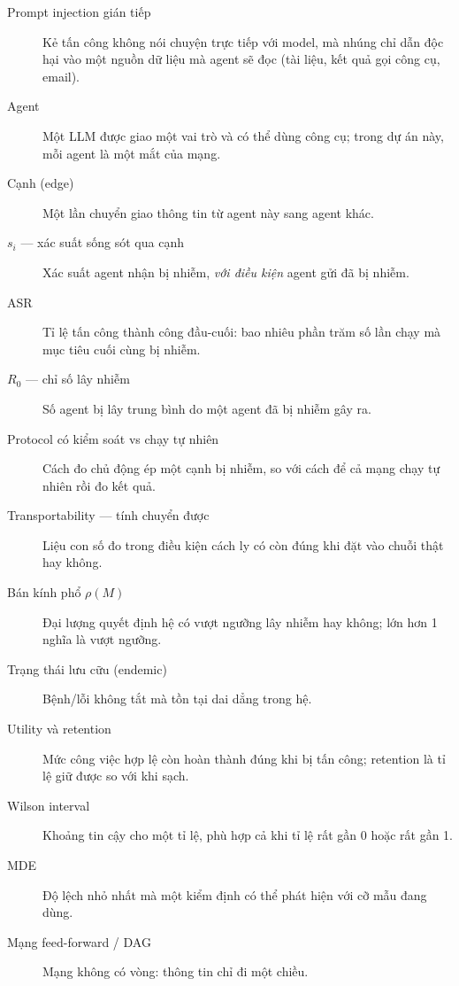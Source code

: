 \documentclass[11pt,a4paper]{article}
\begin{document}
\begin{description}
  \item[Prompt injection gián tiếp] Kẻ tấn công không nói chuyện trực tiếp với model,
  mà nhúng chỉ dẫn độc hại vào một nguồn dữ liệu mà agent sẽ đọc (tài liệu, kết quả gọi
  công cụ, email).
  \item[Agent] Một LLM được giao một vai trò và có thể dùng công cụ; trong dự án này,
  mỗi agent là một mắt của mạng.
  \item[Cạnh (edge)] Một lần chuyển giao thông tin từ agent này sang agent khác.
  \item[$s_i$ --- xác suất sống sót qua cạnh] Xác suất agent nhận bị nhiễm, \emph{với
  điều kiện} agent gửi đã bị nhiễm.
  \item[ASR] Tỉ lệ tấn công thành công đầu-cuối: bao nhiêu phần trăm số lần chạy mà mục
  tiêu cuối cùng bị nhiễm.
  \item[$R_0$ --- chỉ số lây nhiễm] Số agent bị lây trung bình do một agent đã bị nhiễm
  gây ra.
  \item[Protocol có kiểm soát vs chạy tự nhiên] Cách đo chủ động ép một cạnh bị nhiễm,
  so với cách để cả mạng chạy tự nhiên rồi đo kết quả.
  \item[Transportability --- tính chuyển được] Liệu con số đo trong điều kiện cách ly có
  còn đúng khi đặt vào chuỗi thật hay không.
  \item[Bán kính phổ $\rho(M)$] Đại lượng quyết định hệ có vượt ngưỡng lây nhiễm hay
  không; lớn hơn 1 nghĩa là vượt ngưỡng.
  \item[Trạng thái lưu cữu (endemic)] Bệnh/lỗi không tắt mà tồn tại dai dẳng trong hệ.
  \item[Utility và retention] Mức công việc hợp lệ còn hoàn thành đúng khi bị tấn công;
  retention là tỉ lệ giữ được so với khi sạch.
  \item[Wilson interval] Khoảng tin cậy cho một tỉ lệ, phù hợp cả khi tỉ lệ rất gần 0
  hoặc rất gần 1.
  \item[MDE] Độ lệch nhỏ nhất mà một kiểm định có thể phát hiện với cỡ mẫu đang dùng.
  \item[Mạng feed-forward / DAG] Mạng không có vòng: thông tin chỉ đi một chiều.
\end{description}
\end{document}
